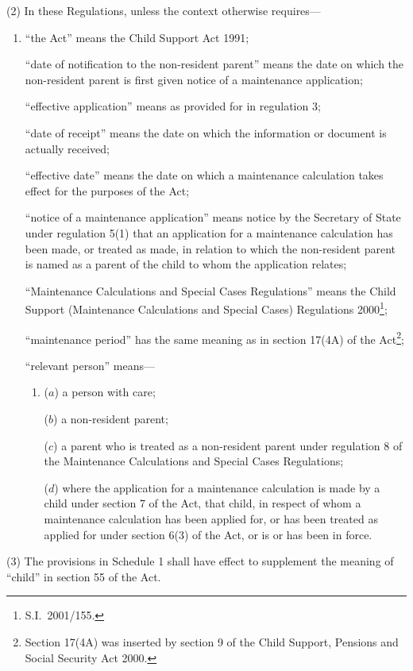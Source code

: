 \documentclass[12pt,a4paper]{article}
\begin{document}
(2) In these Regulations, unless the context otherwise requires—
\begin{enumerate}\item[]
“the Act” means the Child Support Act 1991;

“date of notification to the non-resident parent” means the date on which the non-resident parent is first given notice of a maintenance application;

“effective application” means as provided for in regulation 3;

“date of receipt” means the date on which the information or document is actually received;

“effective date” means the date on which a maintenance calculation takes effect for the purposes of the Act;

“notice of a maintenance application” means notice by the Secretary of State under regulation 5(1) that an application for a maintenance calculation has been made, or treated as made, in relation to which the non-resident parent is named as a parent of the child to whom the application relates;

“Maintenance Calculations and Special Cases Regulations” means the Child Support (Maintenance Calculations and Special Cases) Regulations 2000\footnote{S.I.\ 2001/155.};

“maintenance period” has the same meaning as in section 17(4A) of the Act\footnote{Section 17(4A) was inserted by section 9 of the Child Support, Pensions and Social Security Act 2000.};

“relevant person” means—
\begin{enumerate}\item[]
($a$) 
a person with care;

($b$) 
a non-resident parent;

($c$) 
a parent who is treated as a non-resident parent under regulation 8 of the Maintenance Calculations and Special Cases Regulations;

($d$) 
where the application for a maintenance calculation is made by a child under section 7 of the Act, that child, in respect of whom a maintenance calculation has been applied for, or has been treated as applied for under section 6(3) of the Act, or is or has been in force.
\end{enumerate}
\end{enumerate}

(3) The provisions in Schedule 1 shall have effect to supplement the meaning of “child” in section 55 of the Act.
\end{document}
